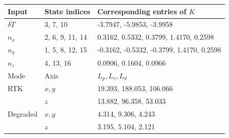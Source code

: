 \begin{tabular}{lll}\toprule
Input & State indices & Corresponding entries of $K$ \\\midrule
$\delta T$ & 3, 7, 10 & -3.7947, -5.9853, -3.9958 \\
$n_x$ & 2, 6, 9, 11, 14 & 0.3162, 0.5332, 0.3799, 1.4170, 0.2598 \\
$n_y$ & 1, 5, 8, 12, 15 & -0.3162, -0.5332, -0.3799, 1.4170, 0.2598 \\
$n_z$ & 4, 13, 16 & 0.0906, 0.1604, 0.0966 \\
\midrule
 Mode & Axis & $L_{p}, L_{v}, L_{d}$ \\\midrule
RTK & $x,y$ & 19.393, 188.053, 106.066 \\
 & $z$ & 13.882, 96.358, 53.033 \\
Degraded & $x,y$ & 4.314, 9.306, 4.243 \\
 & $z$ & 3.195, 5.104, 2.121 \\
\bottomrule\end{tabular}
